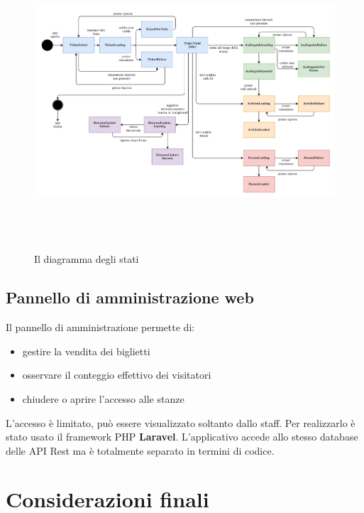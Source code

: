 \documentclass[12pt]{article}
\begin{document}
\begin{center}
    \begin{figure}[htp]
        \centering
        \includegraphics[height=11cm]{diagrams/state_diagrams_v2.png}
        \caption{Il diagramma degli stati}
        \label{fig:state_diagrans}
    \end{figure}
\end{center}
    

\subsection{Pannello di amministrazione web}
Il pannello di amministrazione permette di:
\begin{itemize}
    \item gestire la vendita dei biglietti
    \item osservare il conteggio effettivo dei visitatori
    \item chiudere o aprire l’accesso alle stanze
\end{itemize}
L'accesso è limitato, può essere visualizzato soltanto dallo staff. Per realizzarlo è stato usato il framework PHP \textbf{Laravel}. L'applicativo accede allo stesso database delle API Rest ma è totalmente separato in termini di codice. 





\section{Considerazioni finali}
\end{document}
